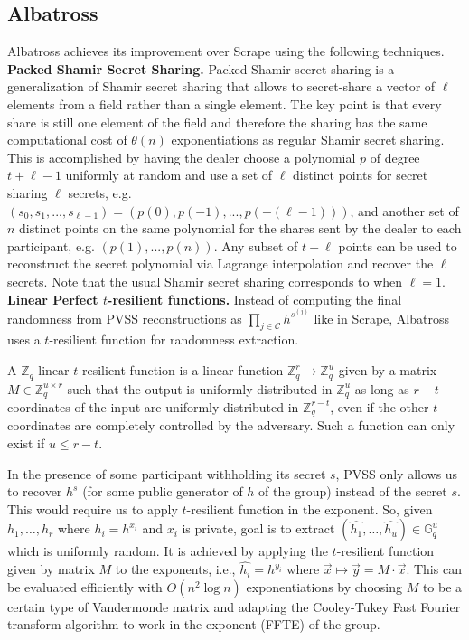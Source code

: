 \documentclass[letterpaper,twocolumn,10pt]{article}
\theoremstyle{definition}
\theoremstyle{remark}
\begin{document}
\subsection{Albatross}
\label{appendix:albatross}
Albatross \cite{cascudo2020albatross} achieves its improvement over Scrape using the following techniques.\\

\noindent\textbf{Packed Shamir Secret Sharing.} Packed Shamir secret sharing is a generalization of Shamir secret sharing that allows to secret-share a vector of $\ell$ elements from a field rather than a single element. The key point is that every share is still one element of the field and therefore the sharing has the same computational cost of $\theta(n)$ exponentiations as regular Shamir secret sharing. This is accomplished by having the dealer choose a polynomial $p$ of degree $t+\ell-1$ uniformly at random and use a set of $\ell$ distinct points for secret sharing $\ell$ secrets, e.g. $(s_0, s_1, ..., s_{\ell - 1}) = (p(0), p(-1), ..., p(-(\ell - 1)))$, and another set of $n$ distinct points on the same polynomial for the shares sent by the dealer to each participant, e.g. $(p(1), ..., p(n))$. Any subset of $t+\ell$ points can be used to reconstruct the secret polynomial via Lagrange interpolation and recover the $\ell$ secrets. Note that the usual Shamir secret sharing corresponds to when $\ell = 1$.\\

\noindent\textbf{Linear Perfect $t$-resilient functions.} Instead of computing the final randomness from PVSS reconstructions as $\prod_{j \in \mathcal{C}} h^{s^{(j)}}$ like in Scrape, Albatross uses a $t$-resilient function for randomness extraction.

A $\mathbb{Z}_q$-linear $t$-resilient function is a linear function $\mathbb{Z}_q^r \rightarrow \mathbb{Z}_q^u$ given by a matrix $M \in \mathbb{Z}_q^{u \times r}$ such that the output is uniformly distributed in $\mathbb{Z}_q^u$ as long as $r-t$ coordinates of the input are uniformly distributed in $\mathbb{Z}_q^{r-t}$, even if the other $t$ coordinates are completely controlled by the adversary. Such a function can only exist if $u \le r-t$.

In the presence of some participant withholding its secret $s$, PVSS only allows us to recover $h^s$ (for some public generator of $h$ of the group) instead of the secret $s$. This would require us to apply $t$-resilient function in the exponent. So, given $h_1, \ldots, h_r$ where $h_i = h^{x_i}$ and $x_i$ is private, goal is to extract $(\hat{h_1},\ldots, \hat{h_u}) \in \mathbb{G}_q^u$ which is uniformly random. It is achieved by applying the $t$-resilient function given by matrix $M$ to the exponents, i.e., $\hat{h_i} = h^{y_i}$ where $\vec{x} \mapsto \vec{y} = M \cdot \vec{x}$. This can be evaluated efficiently with $O(n^2 \log n)$ exponentiations by choosing $M$ to be a certain type of Vandermonde matrix and adapting the Cooley-Tukey Fast Fourier transform algorithm to work in the exponent (FFTE) \cite{cascudo2020albatross} of the group.
\end{document}
